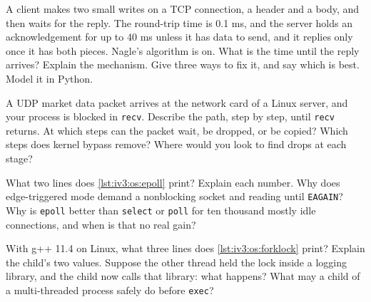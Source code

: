 \begin{question}\label{iq:iv3:operating-systems-concurrency-and-networks:32}
A client makes two small writes on a TCP connection, a header and a body, and then waits for the reply. The round-trip time is 0.1 ms, and the server holds an acknowledgement for up to 40 ms unless it has data to send, and it replies only once it has both pieces. Nagle's algorithm is on. What is the time until the reply arrives? Explain the mechanism. Give three ways to fix it, and say which is best. Model it in Python.
\end{question}

\begin{question}\label{iq:iv3:operating-systems-concurrency-and-networks:33}
A UDP market data packet arrives at the network card of a Linux server, and your process is blocked in \texttt{recv}. Describe the path, step by step, until \texttt{recv} returns. At which steps can the packet wait, be dropped, or be copied? Which steps does kernel bypass remove? Where would you look to find drops at each stage?
\end{question}

\begin{question}\label{iq:iv3:operating-systems-concurrency-and-networks:34}
What two lines does \cref{lst:iv3:os:epoll} print? Explain each number. Why does edge-triggered mode demand a nonblocking socket and reading until \texttt{EAGAIN}? Why is \texttt{epoll} better than \texttt{select} or \texttt{poll} for ten thousand mostly idle connections, and when is that no real gain?
\label{lst:iv3:os:epoll}
\end{question}

\begin{question}\label{iq:iv3:operating-systems-concurrency-and-networks:35}
With g++ 11.4 on Linux, what three lines does \cref{lst:iv3:os:forklock} print? Explain the child's two values. Suppose the other thread held the lock inside a logging library, and the child now calls that library: what happens? What may a child of a multi-threaded process safely do before \texttt{exec}?
\label{lst:iv3:os:forklock}
\end{question}

